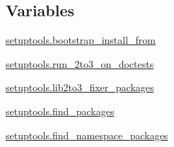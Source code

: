 \subsection*{Variables}
\begin{DoxyCompactItemize}
\item 
\hyperlink{namespacesetuptools_a7d51d85e64a02e0808685340753eec38}{setuptools.\+bootstrap\+\_\+install\+\_\+from}
\item 
\hyperlink{namespacesetuptools_a02cbd18fe112cad981fe27383fd1ee93}{setuptools.\+run\+\_\+2to3\+\_\+on\+\_\+doctests}
\item 
\hyperlink{namespacesetuptools_ab9549f600e3f3e095fc7b60354269255}{setuptools.\+lib2to3\+\_\+fixer\+\_\+packages}
\item 
\hyperlink{namespacesetuptools_af3f752d8ed43dd0bf1640292cf7f2540}{setuptools.\+find\+\_\+packages}
\item 
\hyperlink{namespacesetuptools_aca679eba14fa84f44af47d19f837694b}{setuptools.\+find\+\_\+namespace\+\_\+packages}
\end{DoxyCompactItemize}
